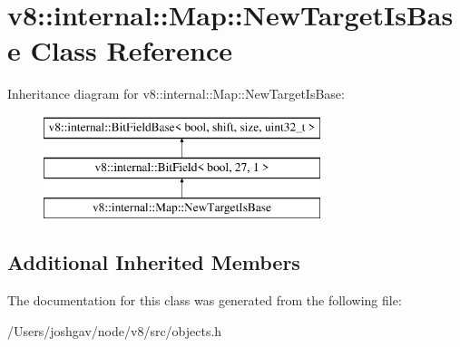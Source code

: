 \hypertarget{classv8_1_1internal_1_1_map_1_1_new_target_is_base}{}\section{v8\+:\+:internal\+:\+:Map\+:\+:New\+Target\+Is\+Base Class Reference}
\label{classv8_1_1internal_1_1_map_1_1_new_target_is_base}
Inheritance diagram for v8\+:\+:internal\+:\+:Map\+:\+:New\+Target\+Is\+Base\+:\begin{figure}[H]
\begin{center}
\leavevmode
\includegraphics[height=3.000000cm]{classv8_1_1internal_1_1_map_1_1_new_target_is_base}
\end{center}
\end{figure}
\subsection*{Additional Inherited Members}


The documentation for this class was generated from the following file\+:\begin{DoxyCompactItemize}
\item 
/\+Users/joshgav/node/v8/src/objects.\+h\end{DoxyCompactItemize}
